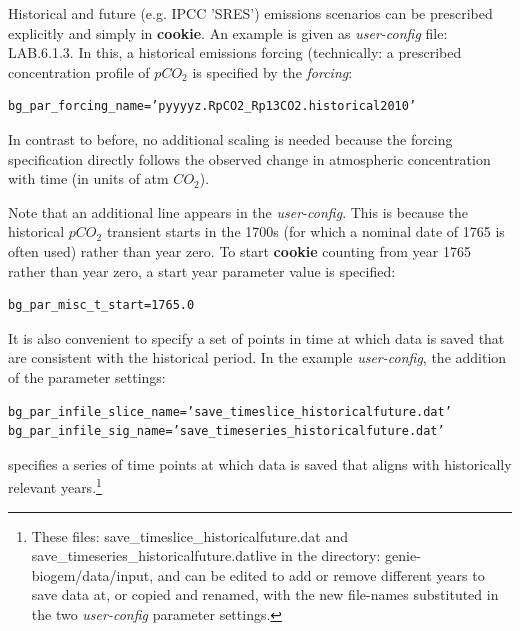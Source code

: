 Historical and future (e.g. IPCC 'SRES') emissions scenarios can  be prescribed explicitly and simply in \textbf{cookie}. An example is given as \textit{user-config} file: \textsf{\footnotesize LAB.6.1.3}. In this, a historical emissions forcing (technically: a prescribed concentration profile of \(pCO_{2}\) is specified by the \textit{forcing}:
\vspace{-2pt}\small\begin{verbatim}
bg_par_forcing_name=’pyyyyz.RpCO2_Rp13CO2.historical2010’
\end{verbatim}\normalsize\vspace{-2pt}
In contrast to before, no additional scaling is needed because the forcing specification directly follows the observed change in atmospheric concentration with time (in units of atm \(CO_{2}\)).

\vspace{1mm}

Note that an additional line appears in the \textit{user-config}. This is because the historical \(pCO_{2}\) transient starts in the 1700s (for which a nominal date of 1765 is often used) rather than year zero. To start \textbf{cookie} counting from year 1765 rather than year zero, a start year parameter value is specified:
\vspace{-2pt}\small\begin{verbatim}
bg_par_misc_t_start=1765.0
\end{verbatim}\normalsize\vspace{-2pt}
It is also convenient to specify a set of points in time at which data is saved that are consistent with the historical period. In the example \textit{user-config}, the addition of the parameter settings:
\vspace{-2pt}\small\begin{verbatim}
bg_par_infile_slice_name=’save_timeslice_historicalfuture.dat’
bg_par_infile_sig_name=’save_timeseries_historicalfuture.dat’
\end{verbatim}\normalsize\vspace{-2pt}
specifies a series of time points at which data is saved that aligns with historically relevant years.\footnote{  These files: \textsf{save\_timeslice\_historicalfuture.dat} and \textsf{save\_timeseries\_historicalfuture.dat}live in the directory: \textsf{genie-biogem/data/input}, and can be edited to add or remove different years to save data at, or copied and renamed, with the new file-names substituted in the two \textit{user-config} parameter settings.}

